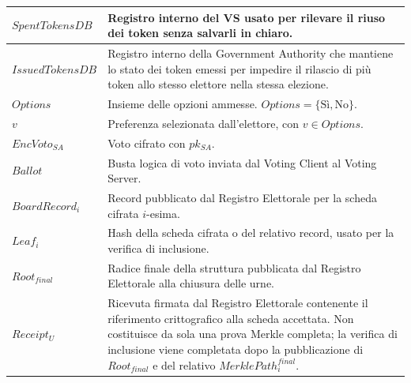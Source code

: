 \documentclass[a4paper,12pt]{article}
\begin{document}
\begin{longtable}{|>{\raggedright\arraybackslash}p{}|>{\raggedright\arraybackslash}p{}|}
	$SpentTokensDB$                       & Registro interno del VS usato per rilevare il riuso dei token senza salvarli in chiaro.                                                                                  \\
	\hline
    $IssuedTokensDB$ & Registro interno della Government Authority che mantiene lo stato dei token emessi per impedire il rilascio di più token allo stesso elettore nella stessa elezione. \\
    \hline
	$Options$                             & Insieme delle opzioni ammesse. $Options = \{\text{Sì}, \text{No}\}$.                                                                                      \\
	\hline
	$v$                                   & Preferenza selezionata dall'elettore, con $v \in Options$.                                                                                                               \\
	\hline
	$EncVoto_{SA}$                        & Voto cifrato con $pk_{SA}$.                                                                                                                                              \\
	\hline
	$Ballot$                              & Busta logica di voto inviata dal Voting Client al Voting Server.                                                                                                         \\
	\hline
	$BoardRecord_i$                       & Record pubblicato dal Registro Elettorale per la scheda cifrata $i$-esima.                                                                                               \\
	\hline
	$Leaf_i$                              & Hash della scheda cifrata o del relativo record, usato per la verifica di inclusione.                                                                                    \\
	\hline
	$Root_{final}$                        & Radice finale della struttura pubblicata dal Registro Elettorale alla chiusura delle urne.                                                                               \\
	\hline
	\(Receipt_U\) & Ricevuta firmata dal Registro Elettorale contenente il riferimento crittografico alla scheda accettata. Non costituisce da sola una prova Merkle completa; la verifica di inclusione viene completata dopo la pubblicazione di \(Root_{final}\) e del relativo \(MerklePath_i^{final}\).                                   \\
	\hline
\end{longtable}
\end{document}
